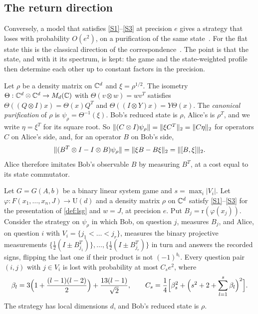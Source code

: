 \subsection{The return direction}\label{sec:return}

Conversely, a model that satisfies \ref{S1}--\ref{S3} at precision $e$ gives a strategy that loses with probability
$O(e^2)$, on a purification of the same state~\cite[Theorem~5.4]{DM-game}. For the flat state this is the classical direction
of the correspondence~\cite[Proposition~4.4(a)]{SV18}. The point is that the state, and with it its spectrum, is kept: the game
and the state-weighted profile then determine each other up to constant factors in the precision.

Let $\rho$ be a density matrix on $\mathbb C^d$ and $\xi=\rho^{1/2}$. The isometry $\Theta:\mathbb C^d\otimes\mathbb C^d\to M_d(\mathbb C)$ with
$\Theta(v\otimes w)=wv^T$ satisfies $\Theta((Q\otimes I)x)=\Theta(x)Q^T$ and $\Theta((I\otimes Y)x)=Y\Theta(x)$. The
\emph{canonical purification} of $\rho$ is $\psi_\rho=\Theta^{-1}(\xi)$. Bob's reduced state is $\rho$, Alice's is
$\rho^T$, and we write $\eta=\xi^T$ for its square root. So $\lVert(C\otimes I)\psi_\rho\rVert=\lVert \xi C^T\rVert_2=\lVert C\eta\rVert_2$ for
operators $C$ on Alice's side, and, for an operator $B$ on Bob's side,
\begin{equation}\label{eq:canonical}
\lVert(B^T\otimes I-I\otimes B)\psi_\rho\rVert=\lVert \xi B-B\xi\rVert_2=\lVert [B,\xi]\rVert_2 .
\end{equation}
Alice therefore imitates Bob's observable $B$ by measuring $B^T$, at a cost equal to its state commutator.

\begin{theorem}\label{thm:return}
Let $G=G(A,b)$ be a binary linear system game and $s=\max_i|V_i|$. Let $\varphi:F(x_1,\dots,x_n,J)\to\mathrm U(d)$ and a
density matrix $\rho$ on $\mathbb C^d$ satisfy \ref{S1}--\ref{S3} for the presentation of \cref{def:lsg} and $w=J$, at precision
$e$. Put $B_j=\mathrm r(\varphi(x_j))$. Consider the strategy on $\psi_\rho$ in which Bob, on question $j$, measures $B_j$,
and Alice, on question $i$ with $V_i=\{j_1<\dots<j_r\}$, measures the binary projective measurements
$\{\frac12(I\pm B_{j_1}^T)\},\dots,\{\frac12(I\pm B_{j_r}^T)\}$ in turn and answers the recorded signs, flipping the last one if their product is not $(-1)^{b_i}$. Every
question pair $(i,j)$ with $j\in V_i$ is lost with probability at most $C_se^2$, where
\[
\beta_l=3\Bigl(1+\frac{(l-1)(l-2)}2\Bigr)+\frac{13(l-1)}{\sqrt2},\qquad C_s=\frac14\Bigl[\beta_s^2+\Bigl(s^2+2+\sum_{l=1}^s\beta_l\Bigr)^2\Bigr].
\]
The strategy has local dimensions $d$, and Bob's reduced state is $\rho$.
\end{theorem}

